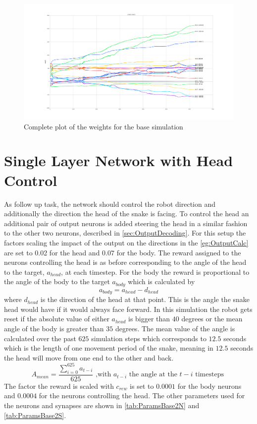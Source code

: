 \begin{figure}[htpb]
  \centering
  \includegraphics[width=\textwidth]{figures/plots/WBase1}
  \caption{ Complete plot of the weights for the base simulation }
  \label{fig:WBase1}
\end{figure}

\section{Single Layer Network with Head Control}
As follow up task, the network should control the robot direction and additionally the direction the head of the snake is facing. To control the head an additional pair of output neurons is added steering the head in a similar fashion to the other two neurons, described in \autoref{sec:OutputDecoding}. For this setup the factors scaling the impact of the output on the directions in the \autoref{eg:OutputCalc} are set to 0.02 for the head and $0.07$ for the body.
The reward assigned to the neurons controlling the head is as before corresponding to the angle of the head to the target, $a_{head}$, at each timestep. For the body the reward is proportional to the angle of the body to the target $a_{body}$ which is calculated by
\begin{equation} \label{eq:bodyAngle}
a_{body} = a_{head} - d_{head}
\end{equation}
where $d_{head}$ is the direction of the head at that point. This is the angle the snake head would have if it would always face forward.
In this simulation the robot gets reset if the absolute value of either $a_{head}$ is bigger than $40$ degrees or the mean angle of the body is greater than $35$ degrees.
The mean value of the angle is calculated over the past $625$ simulation steps which corresponds to $12.5$ seconds which is the length of one movement period of the snake, meaning in $12.5$ seconds the head will move from one end to the other and back. 
\begin{equation}
A_{mean} = \frac { \sum_{i=0}^{625} a_{t-i} } {625} \text{ ,with $a_{t-i}$ the angle at the $t-i$ timesteps }
\end{equation}
The factor the reward is scaled with $c_{rew}$ is set to $0.0001$ for the body neurons and $0.0004$ for the neurons controlling the head. The other parameters used for the neurons and synapses are shown in \autoref{tab:ParamsBase2N} and \autoref{tab:ParamsBase2S}.

